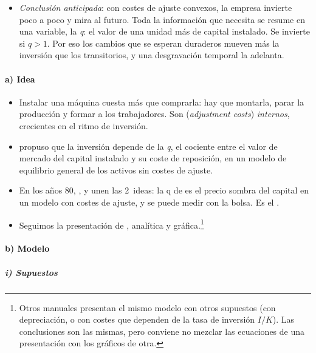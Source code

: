 \documentclass[11pt]{article}
\begin{document}
\begin{itemize}
\item \emph{Conclusión anticipada}: con costes de ajuste convexos, la empresa invierte poco a poco y mira al futuro. Toda la información que necesita se resume en una variable, la \emph{q}: el valor de una unidad más de capital instalado. Se invierte si $q>1$. Por eso los cambios que se esperan duraderos mueven más la inversión que los transitorios, y una desgravación temporal la adelanta.
\end{itemize}

\paragraph{a) Idea}

\begin{itemize}
\item Instalar una máquina cuesta más que comprarla: hay que montarla, parar la producción y formar a los trabajadores. Son  (\emph{adjustment costs}) \emph{internos}, crecientes en el ritmo de inversión\nocite{EisnerStrotz1963,Lucas1967Adjustment,Gould1968Adjustment,Treadway1969Rational}.
\item \textcite{Tobin1969General} propuso que la inversión depende de la \emph{q}, el cociente entre el valor de mercado del capital instalado y su coste de reposición, en un modelo de equilibrio general de los activos sin costes de ajuste.
\item En los años 80, \textcite{Summers1981Taxation}, \textcite{Abel1982Dynamic} y \textcite{Hayashi1982Tobin} unen las 2~ideas: la q de  es el precio sombra del capital en un modelo con costes de ajuste, y se puede medir con la bolsa. Es el .
\item Seguimos la presentación de \textcite[cap.~9]{Romer2019Advanced}, analítica y gráfica.\footnote{Otros manuales presentan el mismo modelo con otros supuestos (con depreciación, o con costes que dependen de la tasa de inversión $I/K$). Las conclusiones son las mismas, pero conviene no mezclar las ecuaciones de una presentación con los gráficos de otra.}
\end{itemize}

\paragraph{b) Modelo}

\subparagraph{i) Supuestos}
\end{document}
